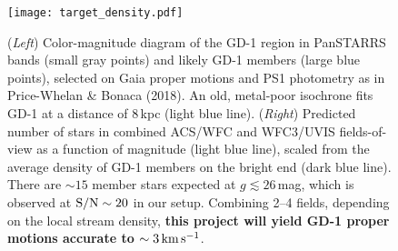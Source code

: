 \documentclass[12pt]{article}
\newcommand{\hst}{\textsl{HST}}
\begin{document}
\begin{figure}
\begin{center}
\texttt{[image: target\_density.pdf]}
\end{center}
\caption{
(\emph{Left}) Color-magnitude diagram of the GD-1 region in PanSTARRS bands (small gray points) and likely GD-1 members (large blue points), selected on Gaia proper motions and PS1 photometry as in Price-Whelan \& Bonaca (2018).
An old, metal-poor isochrone fits GD-1 at a distance of 8\,kpc (light blue line).
(\emph{Right}) Predicted number of stars in combined ACS/WFC and WFC3/UVIS fields-of-view as a function of magnitude (light blue line), scaled from the average density of GD-1 members on the bright end (dark blue line).
There are $\sim15$ member stars expected at $g\lesssim26$\,mag, which is observed at $\rm S/N\sim20$ in our setup.
Combining 2--4 fields, depending on the local stream density, \textbf{this project will yield GD-1 proper motions accurate to $\sim3\,\rm km\,s^{-1}$}.
}
\label{fig:density}
\end{figure}



%
%
\describeobservations   %
\end{document}
